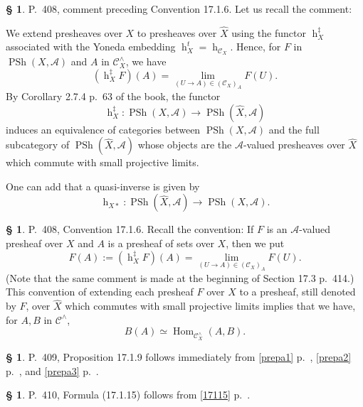 \documentclass[12pt]{article}
\theoremstyle{remark}
\theoremstyle{definition}
\newtheorem{s}[thm]{\S}
\newcommand{\oo}{\operatorname}
\newcommand{\A}{\mathcal A}
\newcommand{\C}{\mathcal C}
\DeclareMathOperator{\Hom}{Hom}
\begin{document}
%

\begin{s}\label{s408}
P.~408, comment preceding Convention 17.1.6. Let us recall the comment: 

We extend presheaves over $X$ to presheaves over $\widehat X$ using the functor $\oo h_X^\ddagger$ associated with the Yoneda embedding $\oo h_X^t=\oo h_{\C_X}$. Hence, for $F$ in $\oo{PSh}(X,\A)$ and $A$ in $\C_X^\wedge$, we have 
$$
(\oo h_X^\ddagger F)(A)=\lim_{(U\to A)\in(\C_X)_A}F(U).
$$ 
By Corollary 2.7.4 p.~63 of the book, the functor 
$$
\oo h_X^\ddagger:\oo{PSh}(X,\A)\to\oo{PSh}(\widehat X,\A)
$$ 
induces an equivalence of categories between $\oo{PSh}(X,\A)$ and the full subcategory of $\oo{PSh}(\widehat X,\A)$ whose objects are the $\A$-valued presheaves over $\widehat X$ which commute with small projective limits. 

One can add that a quasi-inverse is given by 
$$
\oo h_{X*}:\oo{PSh}(\widehat X,\A)\to\oo{PSh}(X,\A). 
$$ 
\end{s}

%

\begin{s}
P.~408, Convention 17.1.6. Recall the convention: If $F$ is an $\A$-valued presheaf over $X$ and $A$ is a presheaf of sets over $X$, then we put 
\begin{equation}\label{408}
F(A):=(\oo h_X^\ddagger F)(A)=\lim_{(U\to A)\in(\C_X)_A}F(U).
\end{equation}
(Note that the same comment is made at the beginning of Section 17.3 p.~414.) This convention of extending each presheaf $F$ over $X$ to a presheaf, still denoted by $F$, over $\widehat X$ which commutes with small projective limits implies that we have, for $A,B$ in $\C^\wedge$, 
$$
B(A)\simeq\Hom_{\C_X^\wedge}(A,B).
$$
\end{s}

%

\begin{s}\label{prepa5}
P.~409, Proposition 17.1.9 follows immediately from \eqref{prepa1} p.~\pageref{prepa1}, \eqref{prepa2} p.~\pageref{prepa2}, and \eqref{prepa3} p.~\pageref{prepa3}.
\end{s}

%

\begin{s}\label{17115b}
P.~410, Formula (17.1.15) follows from \eqref{17115} p.~\pageref{17115}.
\end{s} 

%
\end{document}
